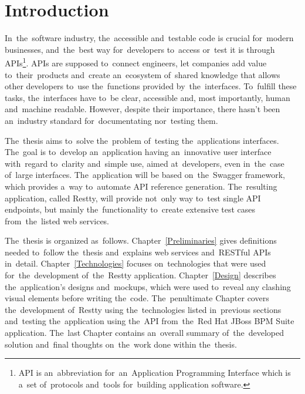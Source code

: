 



\chapter{Introduction}
In~the~software industry, the~accessible and~testable code is crucial for~modern
businesses, and~the~best way for~developers to~access or~test it is through
APIs\footnote{API is an~abbreviation for~an~Application Programming Interface
which is a~set of~protocols and~tools for~building application software.}. APIs
are supposed to~connect engineers, let companies add value to~their~products
and~create an~ecosystem of~shared knowledge that allows other developers to~use
the~functions provided by~the~interfaces. To~fulfill these tasks, the~interfaces
have to~be clear, accessible and, most importantly, human and~machine readable. 
However, despite their importance, there hasn't been an~industry standard
for~documentating nor~testing them.

The~thesis aims to~solve the~problem of~testing the~applications interfaces.
The~goal is to~develop an~application having an~innovative user interface
with~regard to~clarity and~simple use, aimed at~developers, even in~the~case
of~large interfaces. The~application will be based on~the~Swagger framework, which
provides a~way to~automate API reference generation. The~resulting application,
called Restty, will provide not~only way to~test single API endpoints, but
mainly the~functionality to~create extensive test cases from~the~listed web
services.

The~thesis is organized as~follows. Chapter~\ref{Preliminaries} gives
definitions needed to~follow the~thesis and~explains web services and~RESTful
APIs in~detail. Chapter~\ref{Technologies} focuses on~technologies that were
used for~the~development of~the~Restty application. Chapter~\ref{Design} describes
the~application's designs and~mockups, which were used to~reveal any clashing
visual elements before writing the~code. The~penultimate
Chapter covers the~development of~Restty using the~technologies listed
in~previous sections and~testing the~application using the~API from~the~Red Hat
JBoss BPM Suite application. The~last Chapter contains an~overall summary
of~the~developed solution and~final thoughts on~the~work done within the~thesis.






